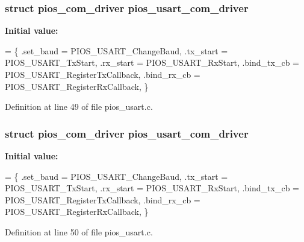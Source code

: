 \hypertarget{group___p_i_o_s___u_s_a_r_t_gae7414398fe53c376d74ea4c0eecb0670}{
\subsubsection[{pios\-\_\-usart\-\_\-com\-\_\-driver}]{\setlength{\rightskip}{0pt plus 5cm}struct {\bf pios\-\_\-com\-\_\-driver} pios\-\_\-usart\-\_\-com\-\_\-driver}}\label{group___p_i_o_s___u_s_a_r_t_gae7414398fe53c376d74ea4c0eecb0670}
{\bfseries Initial value\-:}
\begin{DoxyCode}
= \{
        .set\_baud   = PIOS\_USART\_ChangeBaud,
        .tx\_start   = PIOS\_USART\_TxStart,
        .rx\_start   = PIOS\_USART\_RxStart,
        .bind\_tx\_cb = PIOS\_USART\_RegisterTxCallback,
        .bind\_rx\_cb = PIOS\_USART\_RegisterRxCallback,
\}
\end{DoxyCode}


Definition at line 49 of file pios\-\_\-usart.\-c.

\hypertarget{group___p_i_o_s___u_s_a_r_t_gae7414398fe53c376d74ea4c0eecb0670}{
\subsubsection[{pios\-\_\-usart\-\_\-com\-\_\-driver}]{\setlength{\rightskip}{0pt plus 5cm}struct {\bf pios\-\_\-com\-\_\-driver} pios\-\_\-usart\-\_\-com\-\_\-driver}}\label{group___p_i_o_s___u_s_a_r_t_gae7414398fe53c376d74ea4c0eecb0670}
{\bfseries Initial value\-:}
\begin{DoxyCode}
= \{
        .set\_baud   = PIOS\_USART\_ChangeBaud,
        .tx\_start   = PIOS\_USART\_TxStart,
        .rx\_start   = PIOS\_USART\_RxStart,
        .bind\_tx\_cb = PIOS\_USART\_RegisterTxCallback,
        .bind\_rx\_cb = PIOS\_USART\_RegisterRxCallback,
\}
\end{DoxyCode}


Definition at line 50 of file pios\-\_\-usart.\-c.


